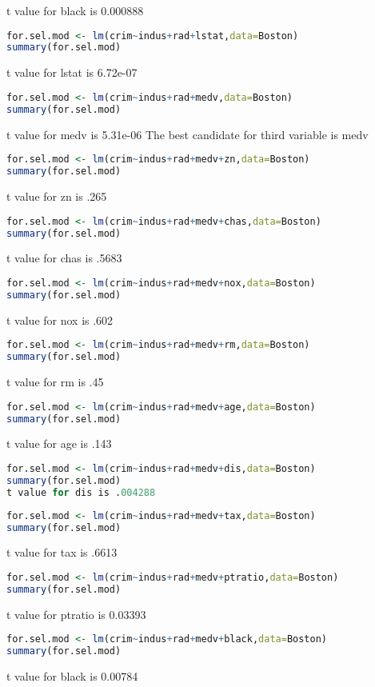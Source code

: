 \documentclass[11pt]{report}
\begin{document}
\begin{itemize}
t value for black is 0.000888
\begin{lstlisting}[language=R]
for.sel.mod <- lm(crim~indus+rad+lstat,data=Boston)
summary(for.sel.mod)
\end{lstlisting}
t value for lstat is 6.72e-07
\begin{lstlisting}[language=R]
for.sel.mod <- lm(crim~indus+rad+medv,data=Boston)
summary(for.sel.mod)
\end{lstlisting}
t value for medv is 5.31e-06
The best candidate for third variable is medv
\begin{lstlisting}[language=R]
for.sel.mod <- lm(crim~indus+rad+medv+zn,data=Boston)
summary(for.sel.mod)
\end{lstlisting}
t value for zn is .265
\begin{lstlisting}[language=R]
for.sel.mod <- lm(crim~indus+rad+medv+chas,data=Boston)
summary(for.sel.mod)
\end{lstlisting}
t value for chas is .5683
\begin{lstlisting}[language=R]
for.sel.mod <- lm(crim~indus+rad+medv+nox,data=Boston)
summary(for.sel.mod)
\end{lstlisting}
t value for nox is .602
\begin{lstlisting}[language=R]
for.sel.mod <- lm(crim~indus+rad+medv+rm,data=Boston)
summary(for.sel.mod)
\end{lstlisting}
t value for rm is .45
\begin{lstlisting}[language=R]
for.sel.mod <- lm(crim~indus+rad+medv+age,data=Boston)
summary(for.sel.mod)
\end{lstlisting}
t value for age is .143
\begin{lstlisting}[language=R]
for.sel.mod <- lm(crim~indus+rad+medv+dis,data=Boston)
summary(for.sel.mod)
t value for dis is .004288
\end{lstlisting}
\begin{lstlisting}[language=R]
for.sel.mod <- lm(crim~indus+rad+medv+tax,data=Boston)
summary(for.sel.mod)
\end{lstlisting}
t value for tax is .6613
\begin{lstlisting}[language=R]
for.sel.mod <- lm(crim~indus+rad+medv+ptratio,data=Boston)
summary(for.sel.mod)
\end{lstlisting}
t value for ptratio is 0.03393
\begin{lstlisting}[language=R]
for.sel.mod <- lm(crim~indus+rad+medv+black,data=Boston)
summary(for.sel.mod)
\end{lstlisting}
t value for black is 0.00784

\end{itemize}
\end{document}
